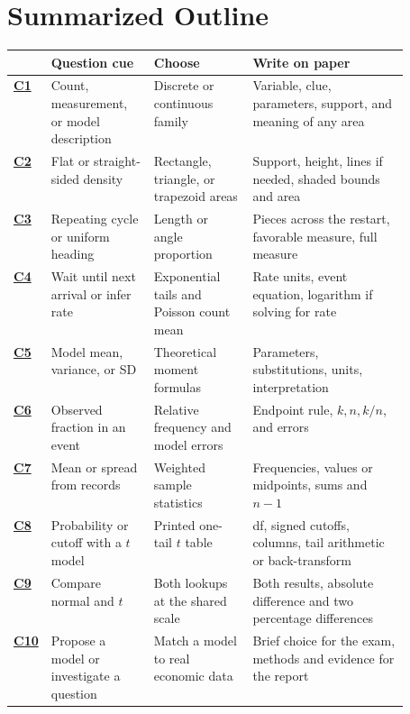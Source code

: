 \section{Summarized Outline}\label{sec:map}
{\small
\begin{tabularx}{\linewidth}{@{}l L{0.26\linewidth} L{0.25\linewidth} Y@{}}
\toprule
& \textbf{Question cue} & \textbf{Choose} & \textbf{Write on paper}\\
\midrule
\hyperref[crit:c1]{\textbf{C1}} & Count, measurement, or model description & Discrete or continuous family & Variable, clue, parameters, support, and meaning of any area\\
\hyperref[crit:c2]{\textbf{C2}} & Flat or straight-sided density & Rectangle, triangle, or trapezoid areas & Support, height, lines if needed, shaded bounds and area\\
\hyperref[crit:c3]{\textbf{C3}} & Repeating cycle or uniform heading & Length or angle proportion & Pieces across the restart, favorable measure, full measure\\
\hyperref[crit:c4]{\textbf{C4}} & Wait until next arrival or infer rate & Exponential tails and Poisson count mean & Rate units, event equation, logarithm if solving for rate\\
\hyperref[crit:c5]{\textbf{C5}} & Model mean, variance, or SD & Theoretical moment formulas & Parameters, substitutions, units, interpretation\\
\hyperref[crit:c6]{\textbf{C6}} & Observed fraction in an event & Relative frequency and model errors & Endpoint rule, \(k,n,k/n\), and errors\\
\hyperref[crit:c7]{\textbf{C7}} & Mean or spread from records & Weighted sample statistics & Frequencies, values or midpoints, sums and \(n-1\)\\
\hyperref[crit:c8]{\textbf{C8}} & Probability or cutoff with a \(t\) model & Printed one-tail \(t\) table & df, signed cutoffs, columns, tail arithmetic or back-transform\\
\hyperref[crit:c9]{\textbf{C9}} & Compare normal and \(t\) & Both lookups at the shared scale & Both results, absolute difference and two percentage differences\\
\hyperref[crit:c10]{\textbf{C10}} & Propose a model or investigate a question & Match a model to real economic data & Brief choice for the exam, methods and evidence for the report\\
\bottomrule
\end{tabularx}
}

\clearpage
